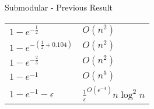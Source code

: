 \begin{frame}{Submodular - Previous Result}
    \begin{center}
        \Large
        \begin{tabular}{l l}
            \hline
            $1 - e^{-\frac{1}{2}}$ & $O(n^2)$
            \\
            \color{orange}$1 - e^{-(\frac{1}{2} + 0.104)}$ & \color{orange}$O(n^2)$
            \\
            \color{orange}$1 - e^{-\frac{2}{3}}$ & \color{orange}$O(n^2)$
            \\
            $1 - e^{-1}$ & $O(n^5)$
            \\
            $1 - e^{-1} - \epsilon$ & $\frac{1}{\epsilon}^{O(\epsilon^{-4})}n \log^2 n$
            \\
            \hline
        \end{tabular}
        
    \end{center}
\end{frame}